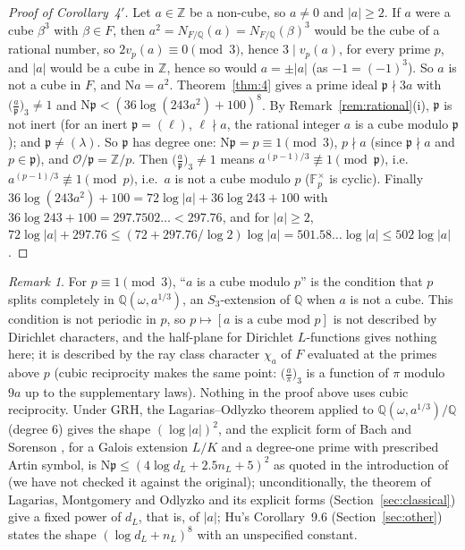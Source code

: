\documentclass[11pt]{article}
\theoremstyle{definition}
\theoremstyle{remark}
\newtheorem{remark}[lemma]{Remark}
\numberwithin{equation}{section}
\newcommand{\Q}{\mathbb Q}
\newcommand{\Z}{\mathbb Z}
\newcommand{\cO}{\mathcal O}
\newcommand{\fp}{\mathfrak p}
\newcommand{\Nm}{\mathrm N}
\newcommand{\cubic}[2]{\bigl(\tfrac{#1}{#2}\bigr)_{3}}
\begin{document}
\begin{proof}[Proof of Corollary~4$'$]
Let $a\in\Z$ be a non-cube, so $a\ne0$ and $|a|\ge2$. If $a$ were a cube $\beta^3$ with $\beta\in F$, then $a^2=N_{F/\Q}(a)=N_{F/\Q}(\beta)^3$ would be the cube of a rational number, so $2v_p(a)\equiv0\pmod3$, hence $3\mid v_p(a)$, for every prime $p$, and $|a|$ would be a cube in $\Z$, hence so would $a=\pm|a|$ (as $-1=(-1)^3$). So $a$ is not a cube in $F$, and $\Nm a=a^2$. Theorem~\ref{thm:4} gives a prime ideal $\fp\nmid3a$ with $\cubic{a}{\fp}\ne1$ and $\Nm\fp<(36\log(243a^2)+100)^8$. By Remark~\ref{rem:rational}(i), $\fp$ is not inert (for an inert $\fp=(\ell)$, $\ell\nmid a$, the rational integer $a$ is a cube modulo $\fp$); and $\fp\ne(\lambda)$. So $\fp$ has degree one: $\Nm\fp=p\equiv1\pmod3$, $p\nmid a$ (since $\fp\nmid a$ and $p\in\fp$), and $\cO/\fp=\Z/p$. Then $\cubic{a}{\fp}\ne1$ means $a^{(p-1)/3}\not\equiv1\pmod\fp$, i.e.\ $a^{(p-1)/3}\not\equiv1\pmod p$, i.e.\ $a$ is not a cube modulo $p$ ($\mathbb F_p^\times$ is cyclic). Finally $36\log(243a^2)+100=72\log|a|+36\log243+100$ with $36\log243+100=297.7502\ldots<297.76$, and for $|a|\ge2$, $72\log|a|+297.76\le(72+297.76/\log2)\log|a|=501.58\ldots\log|a|\le502\log|a|$.
\end{proof}

\begin{remark}\label{rem:hecke}
For $p\equiv1\pmod3$, ``$a$ is a cube modulo $p$'' is the condition that $p$ splits completely in $\Q(\omega,a^{1/3})$, an $S_3$-extension of $\Q$ when $a$ is not a cube. This condition is not periodic in $p$, so $p\mapsto[a\text{ is a cube mod }p]$ is not described by Dirichlet characters, and the half-plane for Dirichlet $L$-functions gives nothing here; it is described by the ray class character $\chi_a$ of $F$ evaluated at the primes above $p$ (cubic reciprocity makes the same point: $\cubic{a}{\pi}$ is a function of $\pi$ modulo $9a$ up to the supplementary laws). Nothing in the proof above uses cubic reciprocity. Under GRH, the Lagarias--Odlyzko theorem \cite{lo1977} applied to $\Q(\omega,a^{1/3})/\Q$ (degree $6$) gives the shape $(\log|a|)^2$, and the explicit form of Bach and Sorenson \cite{bs1996}, for a Galois extension $L/K$ and a degree-one prime with prescribed Artin symbol, is $\Nm\fp\le(4\log d_L+2.5n_L+5)^2$ as quoted in the introduction of \cite{ahnkwon2019} (we have not checked it against the original); unconditionally, the theorem of Lagarias, Montgomery and Odlyzko \cite{lmo1979} and its explicit forms (Section~\ref{sec:classical}) give a fixed power of $d_L$, that is, of $|a|$; Hu's Corollary~9.6 (Section~\ref{sec:other}) states the shape $(\log d_L+n_L)^8$ with an unspecified constant.
\end{remark}
\end{document}
